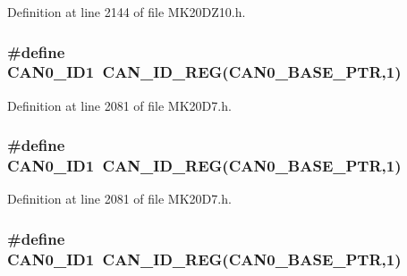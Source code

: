 Definition at line 2144 of file M\+K20\+D\+Z10.\+h.

\subsubsection[{\texorpdfstring{C\+A\+N0\+\_\+\+I\+D1}{CAN0_ID1}}]{\setlength{\rightskip}{0pt plus 5cm}\#define C\+A\+N0\+\_\+\+I\+D1~{\bf C\+A\+N\+\_\+\+I\+D\+\_\+\+R\+EG}({\bf C\+A\+N0\+\_\+\+B\+A\+S\+E\+\_\+\+P\+TR},1)}\hypertarget{group___c_a_n___register___accessor___macros_ga9193ecd27082cb2073877ed94b317b47}{}\label{group___c_a_n___register___accessor___macros_ga9193ecd27082cb2073877ed94b317b47}


Definition at line 2081 of file M\+K20\+D7.\+h.

\subsubsection[{\texorpdfstring{C\+A\+N0\+\_\+\+I\+D1}{CAN0_ID1}}]{\setlength{\rightskip}{0pt plus 5cm}\#define C\+A\+N0\+\_\+\+I\+D1~{\bf C\+A\+N\+\_\+\+I\+D\+\_\+\+R\+EG}({\bf C\+A\+N0\+\_\+\+B\+A\+S\+E\+\_\+\+P\+TR},1)}\hypertarget{group___c_a_n___register___accessor___macros_ga9193ecd27082cb2073877ed94b317b47}{}\label{group___c_a_n___register___accessor___macros_ga9193ecd27082cb2073877ed94b317b47}


Definition at line 2081 of file M\+K20\+D7.\+h.

\subsubsection[{\texorpdfstring{C\+A\+N0\+\_\+\+I\+D1}{CAN0_ID1}}]{\setlength{\rightskip}{0pt plus 5cm}\#define C\+A\+N0\+\_\+\+I\+D1~{\bf C\+A\+N\+\_\+\+I\+D\+\_\+\+R\+EG}({\bf C\+A\+N0\+\_\+\+B\+A\+S\+E\+\_\+\+P\+TR},1)}\hypertarget{group___c_a_n___register___accessor___macros_ga9193ecd27082cb2073877ed94b317b47}{}\label{group___c_a_n___register___accessor___macros_ga9193ecd27082cb2073877ed94b317b47}


